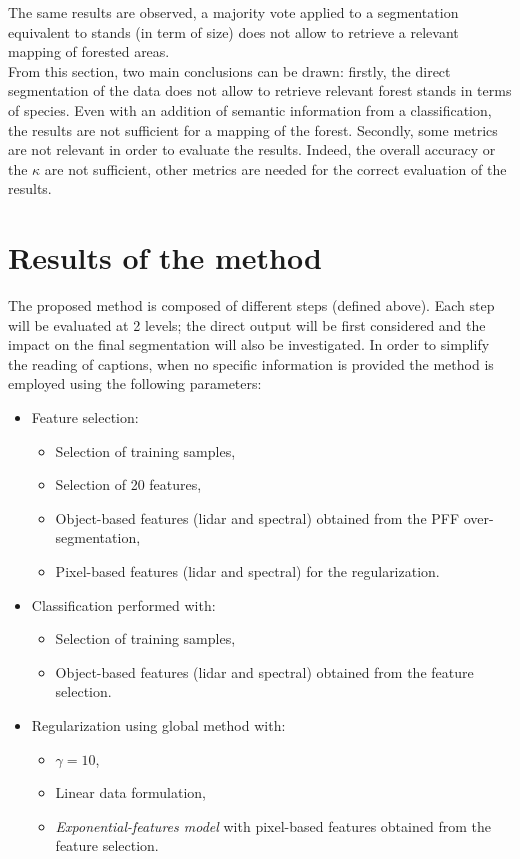 The same results are observed, a majority vote applied to a segmentation equivalent to stands (in term of size) does not allow to retrieve a relevant mapping of forested areas. \\

From this section, two main conclusions can be drawn: firstly, the direct segmentation of the data does not allow to retrieve relevant forest stands in terms of species. Even with an addition of semantic information from a classification, the results are not sufficient for a mapping of the forest. Secondly, some metrics are not relevant in order to evaluate the results. Indeed, the overall accuracy or the $\kappa$ are not sufficient, other metrics are needed for the correct evaluation of the results.

\section{Results of the method}
The proposed method is composed of different steps (defined above). Each step will be evaluated at 2 levels; the direct output will be first considered and the impact on the final segmentation will also be investigated. In order to simplify the reading of captions, when no specific information is provided the method is employed using the following parameters:
\begin{itemize}
\item Feature selection:
\begin{itemize}
\item Selection of training samples,
\item Selection of 20 features,
\item Object-based features (lidar and spectral) obtained from the PFF over-segmentation,
\item Pixel-based features (lidar and spectral) for the regularization.
\end{itemize}
\item Classification performed with:
\begin{itemize}
\item Selection of training samples,
\item Object-based features (lidar and spectral) obtained from the feature selection.
\end{itemize}
\item Regularization using global method with:
\begin{itemize}
\item $\gamma=10$,
\item Linear data formulation,
\item \textit{Exponential-features model} with pixel-based features obtained from the feature selection.
\end{itemize}
\end{itemize}
